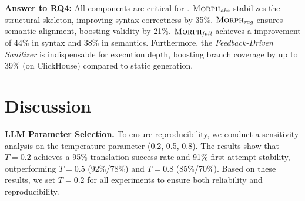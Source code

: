 \documentclass[conference]{IEEEtran}
\begin{document}

\begin{answerbox}
\textbf{Answer to RQ4:} All components are critical for \tool{}. $\textsc{Morph}{}_{\textit{abs}}$ stabilizes the structural skeleton, improving syntax correctness by 35\%. $\textsc{Morph}{}_{\textit{rag}}$ ensures semantic alignment, boosting validity by 21\%. $\textsc{Morph}{}_{\textit{full}}$ achieves a  improvement of 44\% in syntax and 38\% in semantics. 
Furthermore, the \textit{Feedback-Driven Sanitizer} is indispensable for execution depth, boosting branch coverage by up to 39\% (on ClickHouse) compared to static generation.
\end{answerbox}

\section{Discussion}
\label{sec:discussion}

\textbf{LLM Parameter Selection. } \label{sec:llm-params}
To ensure reproducibility, we conduct a sensitivity analysis on the temperature parameter (0.2, 0.5, 0.8). 
The results show that $T=0.2$ achieves a 95\% translation success rate and 91\% first-attempt stability, outperforming $T=0.5$ (92\%/78\%) and $T=0.8$ (85\%/70\%). 
Based on these results, we set $T=0.2$ for all experiments to ensure both reliability and reproducibility.
\end{document}
